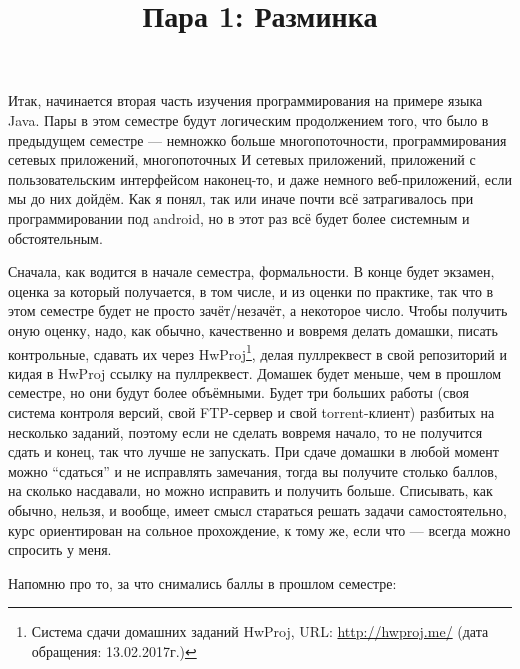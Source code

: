 \documentclass[a5paper]{article}
\title{Пара 1: Разминка}
\date{}
\begin{document}
\maketitle
\thispagestyle{empty}

Итак, начинается вторая часть изучения программирования на примере языка Java. Пары в этом семестре будут логическим продолжением того, что было в предыдущем семестре --- немножко больше многопоточности, программирования сетевых приложений, многопоточных И сетевых приложений, приложений с пользовательским интерфейсом наконец-то, и даже немного веб-приложений, если мы до них дойдём. Как я понял, так или иначе почти всё затрагивалось при программировании под android, но в этот раз всё будет более системным и обстоятельным.

Сначала, как водится в начале семестра, формальности. В конце будет экзамен, оценка за который получается, в том числе, и из оценки по практике, так что в этом семестре будет не просто зачёт/незачёт, а некоторое число. Чтобы получить оную оценку, надо, как обычно, качественно и вовремя делать домашки, писать контрольные, сдавать их через HwProj\footnote{Система сдачи домашних заданий HwProj, URL: \url{http://hwproj.me/} (дата обращения: 13.02.2017г.)}, делая пуллреквест в свой репозиторий и кидая в HwProj ссылку на пуллреквест. Домашек будет меньше, чем в прошлом семестре, но они будут более объёмными. Будет три больших работы (своя система контроля версий, свой FTP-сервер и свой torrent-клиент) разбитых на несколько заданий, поэтому если не сделать вовремя начало, то не получится сдать и конец, так что лучше не запускать. При сдаче домашки в любой момент можно ``сдаться'' и не исправлять замечания, тогда вы получите столько баллов, на сколько насдавали, но можно исправить и получить больше. Списывать, как обычно, нельзя, и вообще, имеет смысл стараться решать задачи самостоятельно, курс ориентирован на сольное прохождение, к тому же, если что --- всегда можно спросить у меня.

Напомню про то, за что снимались баллы в прошлом семестре:\nopagebreak
\end{document}
